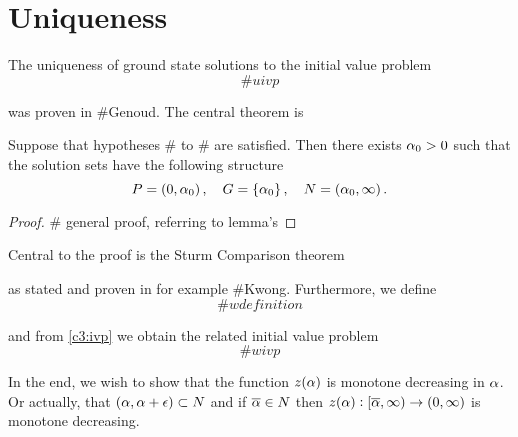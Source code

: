 \newcommand{\e}{\epsilon}
\chapter{Uniqueness}
\label{uniqueness}

The uniqueness of ground state solutions to the initial value problem
\[
\# u ivp
\]

was proven in \#Genoud. The central theorem is
\begin{theorem}
Suppose that {\red hypotheses} \# to \# are satisfied. Then there exists $\alpha_0>0$ such
that the solution sets have the following structure
\[
P = \left(0,\alpha_0\right),\quad G = \left\{\alpha_0\right\},\quad N =
\left(\alpha_0,\infty\right).
\]
\end{theorem}
\begin{proof}
\# general proof, referring to lemma's
\end{proof}

Central to the proof is the Sturm Comparison theorem
\begin{theorem}
\end{theorem}

as stated and proven in for example \#Kwong. Furthermore, we define 
\[
\# w definition
\]

and from \eqref{c3:ivp} we obtain the related initial value problem
\[
\# w ivp
\]

{\red In the end, we wish to show that the function $z(\alpha)$ is monotone decreasing in
$\alpha$. Or actually, that $(\a, \a+\e)\subset N$ and if $\overline{\alpha}\in N$ then $z(\alpha) :
[\overline{\alpha}, \infty)\to(0,\infty)$ is monotone decreasing.}


